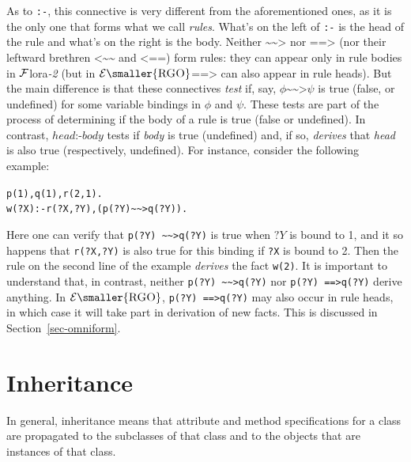 \documentclass[11pt]{article}
\newcommand{\FLORA}{{\mbox{\sc ${\cal F}${lora}\rm\emph{-2}}}\xspace}
\newcommand{\ERGO}{\ensuremath{\cal{E}\mbox{\smaller{\sc{RGO}}}}\xspace}
\newcommand{\rnafarr}{\texttt{\textasciitilde\textasciitilde>}}
\newcommand{\lnafarr}{\texttt{<\textasciitilde\textasciitilde}}
\newcommand{\rnegarr}{\texttt{==>}}
\newcommand{\lnegarr}{\texttt{<==}}
\begin{document}
As to \texttt{:-}, this connective is very different from the
aforementioned ones, as it is the only one that forms what we call
\emph{rules}. What's on the left of \texttt{:-} is the head of the rule and
what's on the right is the body. Neither  $\rnafarr $ nor $\rnegarr $ (nor
their leftward brethren $\lnafarr$ and $\lnegarr$)
form rules: they can appear only in rule bodies in \FLORA
(but in \ERGO $\rnegarr$ can also appear in rule heads).
But the main difference is
that these connectives \emph{test} if, say, $\phi \rnafarr
\psi$ is true (false, or undefined) for some variable bindings in $\phi$ and
$\psi$. These tests are part
of the process of determining if the body of a rule is true (false or
undefined).
In contrast, $head \texttt{:-} body$ tests if \textit{body} is true (undefined) and, if so, \emph{derives} that \emph{head} is also true (respectively,
undefined). For instance, consider the following example:
\begin{alltt}
   p(1), q(1), r(2,1).
   w(?X) :- r(?X,?Y), (p(?Y) \rnafarr q(?Y)).
\end{alltt}
Here one can verify that \texttt{p(?Y) \rnafarr q(?Y)} is true when $?Y$
is bound to 1, and it so happens that \texttt{r(?X,?Y)} is also true for
this binding if \texttt{?X} is bound to 2. Then the rule on the second
line of the example \emph{derives} the fact \texttt{w(2)}.
It is important
to understand that, in contrast, neither \texttt{p(?Y) \rnafarr q(?Y)} nor
\texttt{p(?Y) \rnegarr q(?Y)}  derive anything.
\ifdef{\isfloraman}{}
{
  In \ERGO, \texttt{p(?Y) \rnegarr q(?Y)} may also occur in rule heads,
  in which case it will take part in derivation of new facts. This is
  discussed in Section~\ref{sec-omniform}.
}


\ifdef{\isfloraman}{}
{
    
}

\section{Inheritance}\label{sec-inheritance}

In general, inheritance means that attribute and method specifications for
a class are propagated to the subclasses of that class and to the objects
that are instances of that class.
\end{document}
